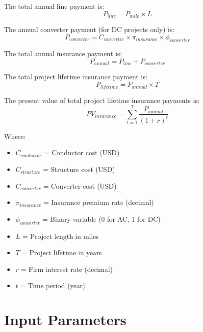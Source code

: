 \documentclass[12pt]{article}
\begin{document}
The total annual line payment is:
\begin{equation}
P_{line} = P_{mile} \times L
\end{equation}

The annual converter payment (for DC projects only) is:
\begin{equation}
P_{converter} = C_{converter} \times \pi_{insurance} \times \phi_{converter}
\end{equation}

The total annual insurance payment is:
\begin{equation}
P_{annual} = P_{line} + P_{converter}
\end{equation}

The total project lifetime insurance payment is:
\begin{equation}
P_{lifetime} = P_{annual} \times T
\end{equation}

The present value of total project lifetime insurance payments is:
\begin{equation}
PV_{insurance} = \sum_{t=1}^{T} \frac{P_{annual}}{(1 + r)^t}
\end{equation}

Where:
\begin{itemize}
    \item $C_{conductor}$ = Conductor cost (USD)
    \item $C_{structure}$ = Structure cost (USD)
    \item $C_{converter}$ = Converter cost (USD)
    \item $\pi_{insurance}$ = Insurance premium rate (decimal)
    \item $\phi_{converter}$ = Binary variable (0 for AC, 1 for DC)
    \item $L$ = Project length in miles
    \item $T$ = Project lifetime in years
    \item $r$ = Firm interest rate (decimal)
    \item $t$ = Time period (year)
\end{itemize}

\section{Input Parameters}
\end{document}
